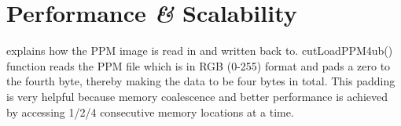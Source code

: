 \chapter{Performance {\itshape{\&}} Scalability}
\label{ch:performance}
explains how the PPM image is read in
and written back to. cutLoadPPM4ub() function reads the PPM file which is in RGB
(0-255) format and pads a zero to the fourth byte, thereby making the data to be
four bytes in total. This padding is very helpful because memory coalescence and
better performance is achieved by accessing 1/2/4 consecutive memory locations
at a time.



